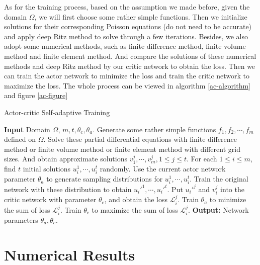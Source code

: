 \documentclass{article}
\begin{document}
\par As for the training process, based on the assumption we made before, given the domain $\Omega$, we will first choose some rather simple functions. Then we initialize solutions for their corresponding Poisson equations (do not need to be accurate) and apply deep Ritz method to solve through a few iterations. Besides, we also adopt some numerical methods, such as finite difference method, finite volume method and finite element method. And compare the solutions of these numerical methods and deep Ritz method by our critic network to obtain the loss. Then we can train the actor network to minimize the loss and train the critic network to maximize the loss. The whole process can be viewed in algorithm 
\ref{ac-algorithm} and figure \ref{ac-figure}
\begin{algorithm}
	\caption{Actor-critic Self-adaptive Training}
	\label{ac-algorithm}
	\begin{algorithmic}[1]
		\State\textbf{Input} Domain $\Omega$, $m, t, \theta_{c}, \theta_{a}$.
		\State Generate some rather simple functions $f_1, f_{2}, \cdots, f_{m}$ defined on $\Omega$.
		\State Solve these partial differential equations with finite difference method or finite volume method or finite element method with different grid sizes. And obtain approximate solutions $v_{1}^{j}, \cdots, v_{m}^{j}, 1\le j\le t$.
		\State For each $1\le i\le m$, find $t$ initial solutions $u_{i}^{1}, \cdots, u_{i}^{t}$ randomly.
		\State Use the current actor network parameter $\theta_{a}$ to generate sampling distributions for $u_{i}^{1}, \cdots, u_{i}^{t}$.
		\State Train the original network with these distribution to obtain $u_{i}'^{1}, \cdots, u_{i}'^{t}$.
		\State Put $u_{i}'^{j}$ and $v_{i}^{j}$ into the critic network with parameter $\theta_{c}$, and obtain the loss $\mathcal{L}_{i}^{j}$.
		\State Train $\theta_{a}$ to minimize the sum of loss $\mathcal{L}_{i}^{j}$.
		\State Train $\theta_{c}$ to maximize the sum of loss $\mathcal{L}_{i}^{j}$.
		\State\textbf{Output:} Network parameters $\theta_{a}, \theta_{c}$.
 	\end{algorithmic}
\end{algorithm}



\section{Numerical Results}
\end{document}
